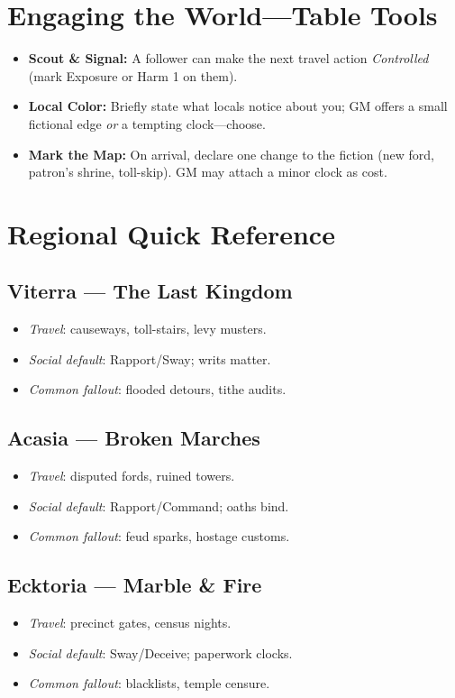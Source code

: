 \begin{multicols}{2}
\section{Engaging the World—Table Tools}
\begin{itemize}
  \item \textbf{Scout \& Signal:} A follower can make the next travel action \emph{Controlled} (mark Exposure or Harm 1 on them).
  \item \textbf{Local Color:} Briefly state what locals notice about you; GM offers a small fictional edge \emph{or} a tempting clock—choose.
  \item \textbf{Mark the Map:} On arrival, declare one change to the fiction (new ford, patron’s shrine, toll-skip). GM may attach a minor clock as cost.
\end{itemize}

\section{Regional Quick Reference}
\subsection*{Viterra — The Last Kingdom}
\begin{itemize}
  \item \emph{Travel}: causeways, toll-stairs, levy musters.
  \item \emph{Social default}: Rapport/Sway; writs matter.
  \item \emph{Common fallout}: flooded detours, tithe audits.
\end{itemize}

\subsection*{Acasia — Broken Marches}
\begin{itemize}
  \item \emph{Travel}: disputed fords, ruined towers.
  \item \emph{Social default}: Rapport/Command; oaths bind.
  \item \emph{Common fallout}: feud sparks, hostage customs.
\end{itemize}

\subsection*{Ecktoria — Marble \& Fire}
\begin{itemize}
  \item \emph{Travel}: precinct gates, census nights.
  \item \emph{Social default}: Sway/Deceive; paperwork clocks.
  \item \emph{Common fallout}: blacklists, temple censure.
\end{itemize}


\end{multicols}
